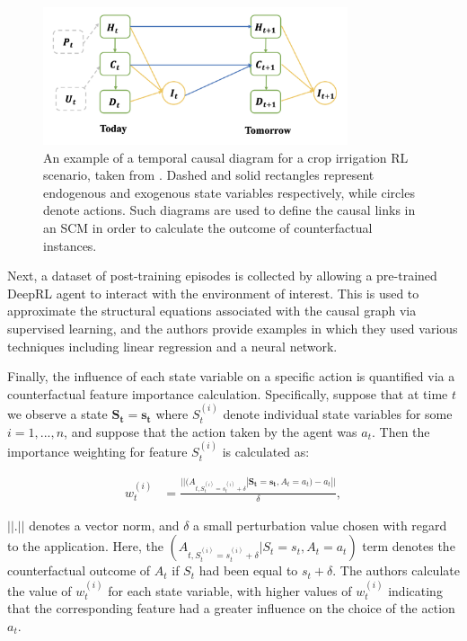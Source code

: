 \documentclass{article}
\begin{document}
\begin{figure}[htp]
    \centering
    \includegraphics[width=0.8\textwidth]{Images/state-action-causal-graph.png}
    \caption{An example of a temporal causal diagram for a crop irrigation RL scenario, taken from \cite{wang2022causal}. Dashed and solid rectangles represent endogenous and exogenous state variables respectively, while circles denote actions. Such diagrams are used to define the causal links in an SCM in order to calculate the outcome of counterfactual instances.} 
    \label{fig:state-action-causal-graph}
\end{figure}

Next, a dataset of post-training episodes is collected by allowing a pre-trained DeepRL agent to interact with the environment of interest. This is used to approximate the structural equations associated with the causal graph via supervised learning, and the authors provide examples in which they used various techniques including linear regression and a neural network.

Finally, the influence of each state variable on a specific action is quantified via a counterfactual feature importance calculation. Specifically, suppose that at time $t$ we observe a state $\mathbf{S_t} = \mathbf{s_t} $ where $S_t^{(i)}$ denote individual state variables for some $i = 1,...,n$, and suppose that the action taken by the agent was $a_t$. Then the importance weighting for feature $S_t^{(i)}$ is calculated as:

\begin{align}
\label{eq: paper_weightings}
    w^{(i)}_t &= \frac{||(A_{t, S^{(i)}_t = s_t^{(i)} + \delta} | \mathbf{S_t = s_t}, A_t = a_t) - a_t ||}{\delta},  
\end{align}

\noindentwhere $|| . ||$ denotes a vector norm, and $\delta $ a small perturbation value chosen with regard to the application. Here, the $(A_{t, S^{(i)}_t = s_t^{(i)} + \delta} | S_t = s_t, A_t = a_t)$ term denotes the counterfactual outcome of $A_t$ if $S_t$ had been equal to $s_t + \delta$. The authors calculate the value of $w_t^{(i)}$ for each state variable, with higher values of $w_t^{(i)}$ indicating that the corresponding feature had a greater influence on the choice of the action $a_t$. 
\end{document}
